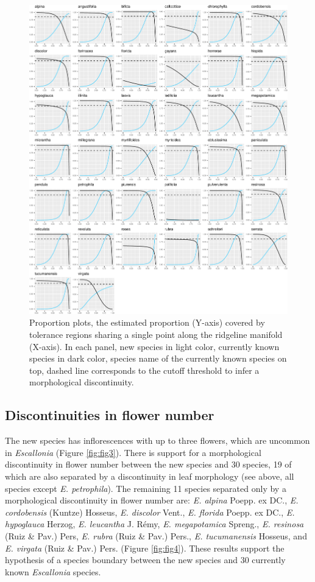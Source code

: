 \documentclass[fleqn,10pt,lineno]{wlpeerj} %
\begin{document}
\begin{figure}[ht]
\centering
\includegraphics[width=\linewidth]{fig2}
\caption{Proportion plots, the estimated proportion (Y-axis) covered by tolerance regions sharing a single point along the ridgeline manifold (X-axis). In each panel, new species in light color, currently known species in dark color, species name of the currently known species on top, dashed line corresponds to the cutoff threshold to infer a morphological discontinuity.}
\label{fig:fig2}
\end{figure}

\subsection*{Discontinuities in flower number}

The new species has inflorescences with up to three flowers, which are uncommon in \emph{Escallonia} (Figure \ref{fig:fig3}). There is support for a morphological discontinuity in flower number between the new species and 30 species, 19 of which are also separated by a discontinuity in leaf morphology (see above, all species except \emph{E. petrophila}). The remaining 11 species separated only by a morphological discontinuity in flower number are: \emph{E. alpina} Poepp. ex DC., \emph{E. cordobensis} (Kuntze) Hosseus, \emph{E. discolor} Vent., \emph{E. florida} Poepp. ex DC., \emph{E. hypoglauca} Herzog, \emph{E. leucantha} J. Rémy, \emph{E. megapotamica} Spreng., \emph{E. resinosa} (Ruiz \& Pav.) Pers, \emph{E. rubra} (Ruiz \& Pav.) Pers., \emph{E. tucumanensis} Hosseus, and \emph{E. virgata} (Ruiz \& Pav.) Pers. (Figure \ref{fig:fig4}). These results support the hypothesis of a species boundary between the new species and 30 currently known \emph{Escallonia} species.
\end{document}
